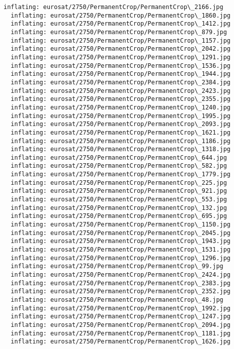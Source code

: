 \documentclass[11pt]{article}
\begin{document}
\begin{Verbatim}[commandchars=\\\{\}]
  inflating: eurosat/2750/PermanentCrop/PermanentCrop\_2166.jpg
  inflating: eurosat/2750/PermanentCrop/PermanentCrop\_1860.jpg
  inflating: eurosat/2750/PermanentCrop/PermanentCrop\_1412.jpg
  inflating: eurosat/2750/PermanentCrop/PermanentCrop\_879.jpg
  inflating: eurosat/2750/PermanentCrop/PermanentCrop\_1157.jpg
  inflating: eurosat/2750/PermanentCrop/PermanentCrop\_2042.jpg
  inflating: eurosat/2750/PermanentCrop/PermanentCrop\_1291.jpg
  inflating: eurosat/2750/PermanentCrop/PermanentCrop\_1536.jpg
  inflating: eurosat/2750/PermanentCrop/PermanentCrop\_1944.jpg
  inflating: eurosat/2750/PermanentCrop/PermanentCrop\_2384.jpg
  inflating: eurosat/2750/PermanentCrop/PermanentCrop\_2423.jpg
  inflating: eurosat/2750/PermanentCrop/PermanentCrop\_2355.jpg
  inflating: eurosat/2750/PermanentCrop/PermanentCrop\_1240.jpg
  inflating: eurosat/2750/PermanentCrop/PermanentCrop\_1995.jpg
  inflating: eurosat/2750/PermanentCrop/PermanentCrop\_2093.jpg
  inflating: eurosat/2750/PermanentCrop/PermanentCrop\_1621.jpg
  inflating: eurosat/2750/PermanentCrop/PermanentCrop\_1186.jpg
  inflating: eurosat/2750/PermanentCrop/PermanentCrop\_1318.jpg
  inflating: eurosat/2750/PermanentCrop/PermanentCrop\_644.jpg
  inflating: eurosat/2750/PermanentCrop/PermanentCrop\_582.jpg
  inflating: eurosat/2750/PermanentCrop/PermanentCrop\_1779.jpg
  inflating: eurosat/2750/PermanentCrop/PermanentCrop\_225.jpg
  inflating: eurosat/2750/PermanentCrop/PermanentCrop\_921.jpg
  inflating: eurosat/2750/PermanentCrop/PermanentCrop\_553.jpg
  inflating: eurosat/2750/PermanentCrop/PermanentCrop\_132.jpg
  inflating: eurosat/2750/PermanentCrop/PermanentCrop\_695.jpg
  inflating: eurosat/2750/PermanentCrop/PermanentCrop\_1150.jpg
  inflating: eurosat/2750/PermanentCrop/PermanentCrop\_2045.jpg
  inflating: eurosat/2750/PermanentCrop/PermanentCrop\_1943.jpg
  inflating: eurosat/2750/PermanentCrop/PermanentCrop\_1531.jpg
  inflating: eurosat/2750/PermanentCrop/PermanentCrop\_1296.jpg
  inflating: eurosat/2750/PermanentCrop/PermanentCrop\_99.jpg
  inflating: eurosat/2750/PermanentCrop/PermanentCrop\_2424.jpg
  inflating: eurosat/2750/PermanentCrop/PermanentCrop\_2383.jpg
  inflating: eurosat/2750/PermanentCrop/PermanentCrop\_2352.jpg
  inflating: eurosat/2750/PermanentCrop/PermanentCrop\_48.jpg
  inflating: eurosat/2750/PermanentCrop/PermanentCrop\_1992.jpg
  inflating: eurosat/2750/PermanentCrop/PermanentCrop\_1247.jpg
  inflating: eurosat/2750/PermanentCrop/PermanentCrop\_2094.jpg
  inflating: eurosat/2750/PermanentCrop/PermanentCrop\_1181.jpg
  inflating: eurosat/2750/PermanentCrop/PermanentCrop\_1626.jpg

\end{Verbatim}
\end{document}
